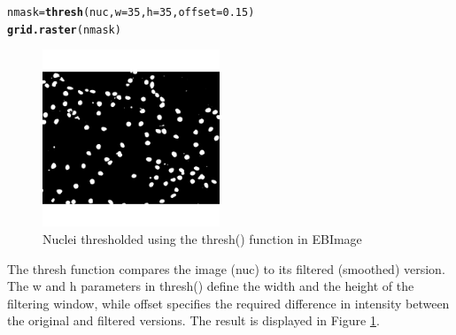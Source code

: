 \documentclass{article}\usepackage[]{graphicx}\usepackage[]{color}
\makeatletter
\newcommand{\hlnum}[1]{\textcolor[rgb]{0.686,0.059,0.569}{#1}}%
\newcommand{\hlstd}[1]{\textcolor[rgb]{0.345,0.345,0.345}{#1}}%
\newcommand{\hlkwb}[1]{\textcolor[rgb]{0.69,0.353,0.396}{#1}}%
\newcommand{\hlkwc}[1]{\textcolor[rgb]{0.333,0.667,0.333}{#1}}%
\newcommand{\hlkwd}[1]{\textcolor[rgb]{0.737,0.353,0.396}{\textbf{#1}}}%
\newenvironment{kframe}{%
 \def\at@end@of@kframe{}%
 \ifinner\ifhmode%
  \def\at@end@of@kframe{\end{minipage}}%
  \begin{minipage}{\columnwidth}%
 \fi\fi%
 \def\FrameCommand##1{\hskip\@totalleftmargin \hskip-\fboxsep
 \colorbox{shadecolor}{##1}\hskip-\fboxsep
     \hskip-\linewidth \hskip-\@totalleftmargin \hskip\columnwidth}%
 \MakeFramed {\advance\hsize-\width
   \@totalleftmargin\z@ \linewidth\hsize
   \@setminipage}}%
 {\par\unskip\endMakeFramed%
 \at@end@of@kframe}
\newenvironment{knitrout}{}{} %
\makeatother
\begin{document}
\begin{knitrout}
\color{fgcolor}\begin{kframe}
\begin{alltt}
\hlstd{nmask} \hlkwb{=} \hlkwd{thresh}\hlstd{(nuc,} \hlkwc{w}\hlstd{=}\hlnum{35}\hlstd{,} \hlkwc{h}\hlstd{=}\hlnum{35}\hlstd{,} \hlkwc{offset}\hlstd{=}\hlnum{0.15}\hlstd{)}
\hlkwd{grid.raster}\hlstd{(nmask)}
\end{alltt}
\end{kframe}\begin{figure}

{\centering \includegraphics[width=200px]{knit_figure/figthr-1} 

}

\caption[Nuclei thresholded using the thresh() function in EBImage]{Nuclei thresholded using the thresh() function in EBImage\label{fig:thr}}
\end{figure}


\end{knitrout}
The thresh function compares the image (nuc) to its filtered (smoothed) version. The w and h parameters in thresh() define the width and the height of the filtering window, while offset specifies the required difference in intensity between the original and filtered versions. The result is displayed in Figure \ref{fig:thr}.
\end{document}
